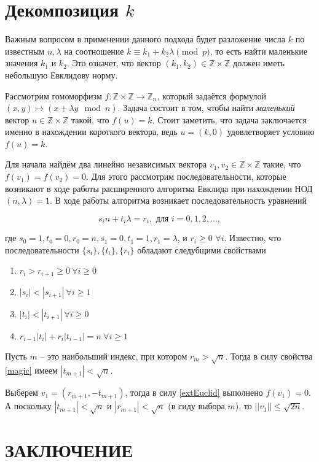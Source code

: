 \documentclass[a4paper,12pt]{article}
\theoremstyle{definition}
\theoremstyle{underline}
\begin{document}
	\newpage
	\section{Декомпозиция $k$}
	
	Важным вопросом в применении данного подхода будет разложение числа $k$ по известным $n, \lambda$ на соотношение $k \equiv k_1 + k_2 \lambda \pmod{p}$, то есть найти маленькие значения $k_1$ и $k_2$. Это означет, что вектор $(k_1, k_2) \in \mathbb{Z} \times \mathbb{Z}$ должен иметь небольшую Евклидову норму.
	
	Рассмотрим гомоморфизм $f: \mathbb{Z} \times \mathbb{Z} \rightarrow \mathbb{Z}_n$, который задаётся формулой $(x, y)  \mapsto (x + \lambda y \mod n) $. Задача состоит в том, чтобы найти \emph{маленький} вектор $u \in  \mathbb{Z} \times \mathbb{Z}$ такой, что $f(u)=k$. Стоит заметить, что задача заключается именно в нахождении короткого вектора, ведь $u=(k, 0)$ удовлетворяет условию $f(u)=k$.
	
	Для начала найдём два линейно независимых вектора $v_1, v_2 \in \mathbb{Z} \times \mathbb{Z}$  такие, что $f(v_1)=f(v_2)=0$. Для этого рассмотрим последовательности, которые возникают в ходе работы расширенного алгоритма Евклида при нахождении НОД$(n, \lambda)=1$. В ходе работы алгоритма возникает последовательность уравнений 
	
	\begin{equation} \label{extEuclid}
		s_i n + t_i \lambda = r_i, \text{ для } i=0,1,2,...,
	\end{equation}
	
	где $s_0=1, t_0=0, r_0=n, s_1=0, t_1=1, r_1=\lambda$, и $r_i \geqslant 0$ $\forall i$. Известно, что последовательности $\{s_i\}, \{t_i\}, \{r_i\}$ обладают следубщими свойствами
	
	\begin{enumerate}[label=\arabic*),topsep=0pt,itemsep=-0.5ex,partopsep=1ex,parsep=1ex]
		\item $r_i > r_{i+1} \geqslant 0 \ \forall i \geqslant 0$
		\item $|s_i| < |s_{i+1}| \ \forall i \geqslant 1$
		\item $|t_i| < |t_{i+1}| \ \forall i \geqslant 0$
		\item \label{magic} $r_{i-1}|t_i| + r_i|t_{i-1}| = n \ \forall i \geqslant 1$ 
	\end{enumerate}

	Пусть $m$ -- это наибольший индекс, при котором $r_m > \sqrt{n}$. Тогда в силу свойства \ref{magic} имеем $|t_{m+1}| < \sqrt{n}$. 
	
	Выберем $v_1=(r_{m+1}, -t_{m+1})$, тогда в силу \eqref{extEuclid} выполнено $f(v_1)=0$. А поскольку $|t_{m+1}| < \sqrt{n}$ и $|r_{m+1}| < \sqrt{n}$ (в сиду выбора $m$), то $||v_1|| \leqslant \sqrt{2n}$.
	
	\section*{ЗАКЛЮЧЕНИЕ}
	
	
	\newpage
	\printbibliography[title={БИБЛИОГРАФИЧЕСКИЙ СПИСОК}]
		
	
\end{document}
